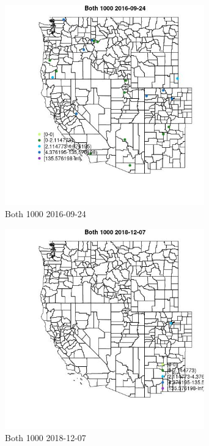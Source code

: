 \begin{figure} 
\centering  
\includegraphics[width=0.77\textwidth]{Code_Outputs/Report_ML_input_PM25_Step4_part_e_de_duplicated_aves_MapObsBoth_10002016-09-24.jpg} 
\caption{\label{fig:Report_ML_input_PM25_Step4_part_e_de_duplicated_avesMapObsBoth_10002016-09-24}Both 1000 2016-09-24} 
\end{figure} 
 

\begin{figure} 
\centering  
\includegraphics[width=0.77\textwidth]{Code_Outputs/Report_ML_input_PM25_Step4_part_e_de_duplicated_aves_MapObsBoth_10002018-12-07.jpg} 
\caption{\label{fig:Report_ML_input_PM25_Step4_part_e_de_duplicated_avesMapObsBoth_10002018-12-07}Both 1000 2018-12-07} 
\end{figure} 
 

